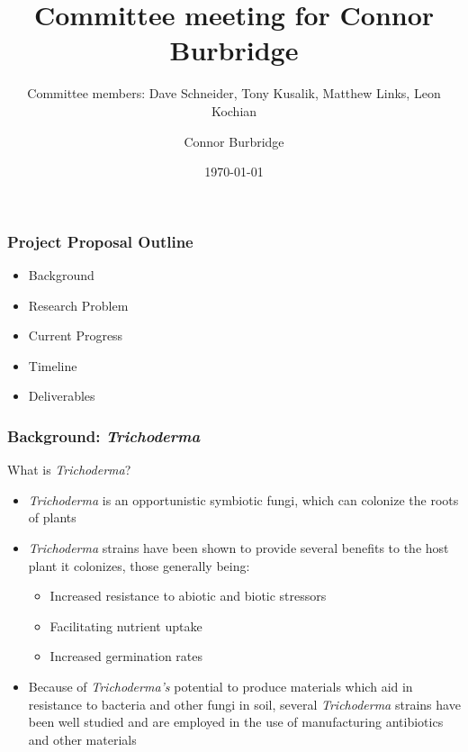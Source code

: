 \documentclass{beamer}
\title{Committee meeting for Connor Burbridge}
\subtitle{Committee members: Dave Schneider, Tony Kusalik, Matthew Links, Leon Kochian}
\author{Connor Burbridge}
\date{\today}
\begin{document}
\begin{frame}
  \titlepage
\end{frame}

\begin{frame}
  \frametitle{Project Proposal Outline}
  \begin{itemize}
  \item Background
  \item Research Problem
  \item Current Progress
  \item Timeline
  \item Deliverables
  \end{itemize}
\end{frame}

\begin{frame}
  \frametitle{Background: \textit{Trichoderma}}
  What is \textit{Trichoderma}?
  \begin{itemize}
  \item \textit{Trichoderma} is an opportunistic symbiotic fungi, which
    can colonize the roots of plants
  \item \textit{Trichoderma} strains have been shown to provide
    several benefits to the host plant it colonizes, those generally
    being:
    \begin{itemize}
      \item Increased resistance to abiotic and biotic stressors
      \item Facilitating nutrient uptake
      \item Increased germination rates
    \end{itemize}
  \item Because of \textit{Trichoderma's} potential to produce
    materials which aid in resistance to bacteria and other fungi in
    soil, several \textit{Trichoderma} strains have been well studied
    and are employed in the use of manufacturing antibiotics and other
    materials
  \end{itemize}
\end{frame}
\end{document}
